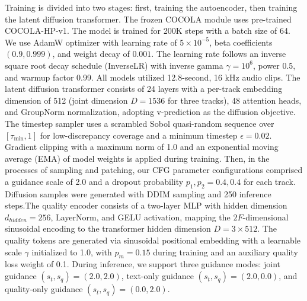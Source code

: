 \documentclass[lettersize,journal]{IEEEtran}
\begin{document}
Training is divided into two stages: first, training the autoencoder, then training the latent diffusion transformer. The frozen COCOLA \cite{ciranni2025cocola} module uses pre-trained COCOLA-HP-v1. The model is trained for 200K steps with a batch size of 64. We use AdamW optimizer with learning rate of $5\times10^{-5}$, beta coefficients $(0.9, 0.999)$, and weight decay of $0.001$. The learning rate follows an inverse square root decay schedule (InverseLR) with inverse gamma $\gamma=10^6$, power 0.5, and warmup factor 0.99. All models utilized 12.8-second, 16 kHz audio clips. The latent diffusion transformer consists of 24 layers with a per-track embedding dimension of 512 (joint dimension $D=1536$ for three tracks), 48 attention heads, and GroupNorm normalization, adopting v-prediction as the diffusion objective. The timestep sampler uses a scrambled Sobol quasi-random sequence over $[\tau_{\min}, 1]$ for low-discrepancy coverage and a minimum timestep $\epsilon=0.02$. Gradient clipping with a maximum norm of 1.0 and an exponential moving average (EMA) of model weights is applied during training. Then, in the processes of sampling and patching, our CFG parameter configurations comprised a guidance scale of 2.0 and a dropout probability $p_1,p_2=0.4,0.4$ for each track. Diffusion samples were generated with DDIM sampling and 250 inference steps.The quality encoder consists of a two-layer MLP with hidden dimension $d_{\mathit{hidden}}=256$, LayerNorm, and GELU activation, mapping the $2F$-dimensional sinusoidal encoding to the transformer hidden dimension $D=3 \times 512$. The quality tokens are generated via sinusoidal positional embedding with a learnable scale $\gamma$ initialized to 1.0, with $p_m = 0.15$ during training and an auxiliary quality loss weight of 0.1. During inference, we support three guidance modes: joint guidance $(s_t, s_q) = (2.0, 2.0)$, text-only guidance $(s_t, s_q) = (2.0, 0.0)$, and quality-only guidance $(s_t, s_q) = (0.0, 2.0)$. 
\end{document}
